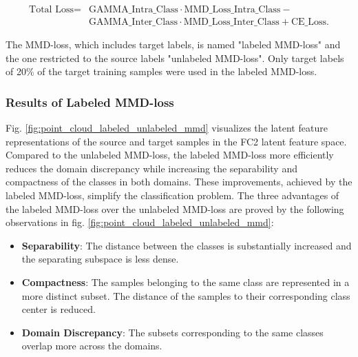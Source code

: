 \begin{equation}
\begin{split}
    \mbox{Total Loss} = & \mbox{GAMMA\_Intra\_Class}  \cdot \mbox{MMD\_Loss\_Intra\_Class} - \\
                              &\mbox{GAMMA\_Inter\_Class} \cdot \mbox{MMD\_Loss\_Inter\_Class} + \mbox{CE\_Loss}.
\end{split}
\end{equation}

The MMD-loss, which includes target labels, is named "labeled MMD-loss" and the one restricted to the source labels "unlabeled MMD-loss". Only target labels of 20\% of the target training samples were used in the labeled MMD-loss.

\subsubsection{Results of Labeled MMD-loss}
Fig. \ref{fig:point_cloud_labeled_unlabeled_mmd} visualizes the latent feature representations of the source and target samples in the FC2 latent feature space. Compared to the unlabeled MMD-loss, the labeled MMD-loss more efficiently reduces the domain discrepancy while increasing the separability and compactness of the classes in both domains. These improvements, achieved by the labeled MMD-loss, simplify the classification problem. The three advantages of the labeled MMD-loss over the unlabeled MMD-loss are proved by the following observations in fig. \ref{fig:point_cloud_labeled_unlabeled_mmd}:
\begin{itemize}
    \item \textbf{Separability}: The distance between the classes is substantially increased and the separating subspace is less dense.
    \item \textbf{Compactness}: The samples belonging to the same class are represented in a more distinct subset. The distance of the samples to their corresponding class center is reduced. 
    \item \textbf{Domain Discrepancy}: The subsets corresponding to the same classes overlap more across the domains.
\end{itemize}

